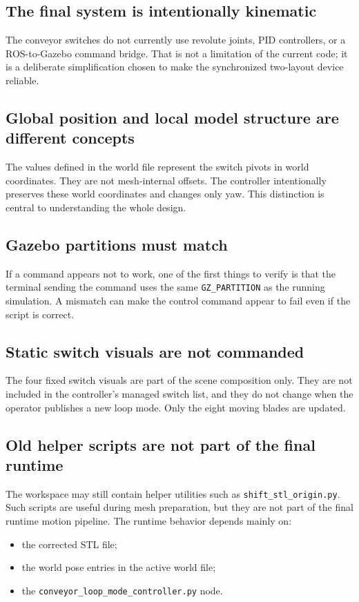 \documentclass[11pt,a4paper]{article}
\begin{document}
\subsection{The final system is intentionally kinematic}
The conveyor switches do not currently use revolute joints, PID controllers, or a ROS-to-Gazebo command bridge. That is not a limitation of the current code; it is a deliberate simplification chosen to make the synchronized two-layout device reliable.

\subsection{Global position and local model structure are different concepts}
The values defined in the world file represent the switch pivots in world coordinates. They are not mesh-internal offsets. The controller intentionally preserves these world coordinates and changes only yaw. This distinction is central to understanding the whole design.

\subsection{Gazebo partitions must match}
If a command appears not to work, one of the first things to verify is that the terminal sending the command uses the same \texttt{GZ\_PARTITION} as the running simulation. A mismatch can make the control command appear to fail even if the script is correct.

\subsection{Static switch visuals are not commanded}
The four fixed switch visuals are part of the scene composition only. They are not included in the controller's managed switch list, and they do not change when the operator publishes a new loop mode. Only the eight moving blades are updated.

\subsection{Old helper scripts are not part of the final runtime}
The workspace may still contain helper utilities such as \texttt{shift\_stl\_origin.py}. Such scripts are useful during mesh preparation, but they are not part of the final runtime motion pipeline. The runtime behavior depends mainly on:
\begin{itemize}
\item the corrected STL file;
\item the world pose entries in the active world file;
\item the \texttt{conveyor\_loop\_mode\_controller.py} node.
\end{itemize}
\end{document}
